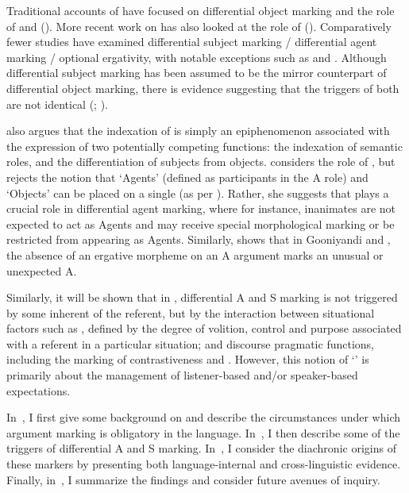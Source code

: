 \documentclass[output=paper]{LSP/langsci}
\begin{document}
Traditional accounts of  have focused on differential object marking and the role of  and  (\eg \citealt{Bossong1983Animacy,Bossong1985Differentielle,Aissen2003Differential}). More recent work on  has also looked at the role of  (\eg \citealt{Dalrympleetal2011Objects,Iemmoloetal2014Introduction}). Comparatively fewer studies have examined differential subject marking / differential agent marking / optional ergativity, with notable exceptions such as \citet{deHoopetal2008Differential} and  \citet{McGregoretal2010Optional}. Although differential subject marking has been assumed to be the mirror counterpart of differential object marking, there is evidence suggesting that the triggers of both are not identical (\citealt{Malchukov2008Animacy}; \citealt{Fauconnier2011Differential}).


\citet{Malchukov2008Animacy} also argues that the indexation of  is simply an epiphenomenon associated with the expression of two potentially competing functions: the indexation of semantic roles, and the differentiation of subjects from objects. \citet{Fauconnier2011Differential} considers the role of , but rejects the notion that ‘Agents’ (defined as participants in the A role) and ‘Objects’ can be placed on a single  (as per \citealt{Silverstein1976Hierarchy}). Rather, she suggests that  plays a crucial role in differential agent marking, where for instance, inanimates are not expected to act as Agents and may receive special morphological marking or be restricted from appearing as Agents. Similarly, \citet{McGregor2010Optional} shows that in Gooniyandi and , the absence of an ergative morpheme on an A argument marks an unusual or unexpected A.

\largerpage
Similarly, it will be shown that in , differential A and S marking is not triggered by some inherent  of the referent, but by the interaction between situational factors such as , defined by the degree of volition, control and purpose associated with a referent in a particular situation; and discourse pragmatic functions, including the marking of contrastiveness and . However, this notion of ‘’ is primarily about the management of listener-based and/or speaker-based expectations.

In~, I first give some background on  and describe the circumstances under which argument marking is obligatory in the language. In~, I then describe some of the triggers of differential A and S marking. In~, I consider the diachronic origins of these markers by presenting both language-internal and cross-linguistic evidence. Finally, in~, I summarize the findings and consider future avenues of inquiry.
\end{document}
